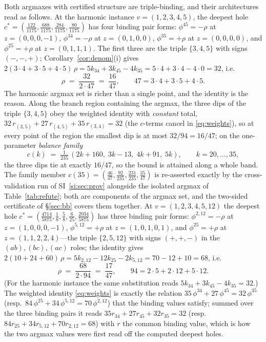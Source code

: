 Both argmaxes with certified structure are triple-binding, and their
architectures read
as follows. At the harmonic instance $v=(1,2,3,4,5)$, the deepest hole
$c^{*}=(\tfrac{122}{1175},\tfrac{688}{1175},\tfrac{284}{1175},
\tfrac{80}{1175})$ has four binding pair forms:
$\phi^{45}=-\rho$ at $z=(0,0,0,-1)$, $\phi^{34}=-\rho$ at
$z=(0,1,0,0)$, $\phi^{35}=+\rho$ at $z=(0,0,0,0)$, and
$\phi^{25}=+\rho$ at $z=(0,1,1,1)$. The first three are the triple
$\{3,4,5\}$ with signs $(-,-,+)$; Corollary~\ref{cor:denom}(i) gives
$2(3\cdot4+3\cdot5+4\cdot5)\,\rho=5k_{34}+3k_{45}-4k_{35}
=5\cdot4+3\cdot4-4\cdot0=32$, i.e.
\[
\rho\;=\;\frac{32}{2\cdot 47}\;=\;\frac{16}{47},
\qquad 47=3\cdot4+3\cdot5+4\cdot5.
\]
The harmonic argmax set is richer than a single point, and the identity
is the reason. Along the branch region containing the argmax, the three
dips of the triple $\{3,4,5\}$ obey the weighted identity with
\emph{constant} total,
$32\,r_{(3,5)}+27\,r_{(4,5)}+35\,r_{(3,4)}=32$ (the $c$-terms cancel
in \eqref{eq:weights}), so at every point of the region the smallest
dip is at most $32/94=16/47$; on the one-parameter \emph{balance
family}
\[
c(k)\;=\;\tfrac{1}{235}\,(2k{+}160,\;3k{-}13,\;4k{+}91,\;5k),
\qquad k=20,\dots,35,
\]
the three dips tie at exactly $16/47$, so the bound is attained along a
whole band. The family member $c(35)=(\tfrac{46}{47},
\tfrac{92}{235},\tfrac{231}{235},\tfrac{35}{47})$ is re-asserted
exactly by the cross-validation run of SI~\ref{si:sec:prov}
alongside the isolated argmax of Table~\ref{tab:refute}; both are
components of the argmax set, and the two-sided certificate of
\S\ref{sec:bb} covers them together.
At $v=(1,2,3,4,5,12)$ the deepest hole
$c^{*}=(\tfrac{4714}{5875},\tfrac18,\tfrac58,\tfrac6{25},
\tfrac{2034}{5875})$ has three binding pair forms: $\phi^{2,12}=-\rho$
at $z=(1,0,0,0,-1)$, $\phi^{5,12}=+\rho$ at $z=(1,0,1,0,1)$, and
$\phi^{25}=+\rho$ at $z=(1,1,2,2,4)$---the triple $\{2,5,12\}$ with
signs $(+{,}+{,}-)$ in the $(ab),(bc),(ac)$ roles; the identity gives
$2(10+24+60)\,\rho=5k_{2,12}-12k_{25}-2k_{5,12}=70-12+10=68$, i.e.
\[
\rho\;=\;\frac{68}{2\cdot 94}\;=\;\frac{17}{47},
\qquad 94=2\cdot5+2\cdot12+5\cdot12.
\]
(For the harmonic instance the same substitution reads
$5k_{34}+3k_{45}-4k_{35}=32$.)
The weighted identity \eqref{eq:weights} is exactly the relation
$35\,\phi^{34}+27\,\phi^{45}=32\,\phi^{35}$ (resp.\
$84\,\phi^{25}+34\,\phi^{5,12}=70\,\phi^{2,12}$) that the binding
values satisfy; summed over the three binding pairs it reads
$35r_{34}+27r_{45}+32r_{35}=32$ (resp.\ $84r_{25}+34r_{5,12}+70r_{2,12}
=68$) with $r$ the common binding value, which is how the two argmax
values were first read off the computed deepest holes.

